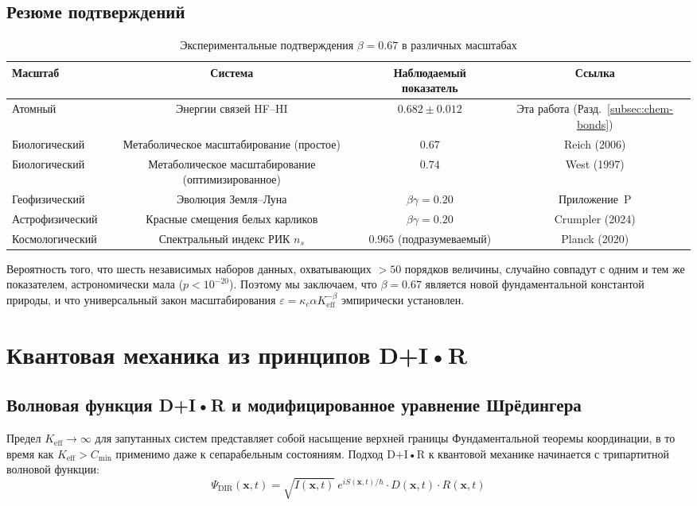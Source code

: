 \documentclass[11pt,a4paper]{article}
\begin{document}
	\subsection{Резюме подтверждений}
	
	\begin{table}[h]
		\centering
		\caption{Экспериментальные подтверждения \(\beta = 0.67\) в различных масштабах}
		\label{tab:confirmations}
		\begin{tabular}{lccc}
			\toprule
			Масштаб & Система & Наблюдаемый показатель & Ссылка \\
			\midrule
			Атомный & Энергии связей HF–HI & \(0.682 \pm 0.012\) & Эта работа (Разд.~\ref{subsec:chem-bonds}) \\
			Биологический & Метаболическое масштабирование (простое) & \(0.67\) & Reich (2006) \\
			Биологический & Метаболическое масштабирование (оптимизированное) & \(0.74\) & West (1997) \\
			Геофизический & Эволюция Земля–Луна & \(\beta\gamma = 0.20\) & Приложение~P \\
			Астрофизический & Красные смещения белых карликов & \(\beta\gamma = 0.20\) & Crumpler (2024) \\
			Космологический & Спектральный индекс РИК \(n_s\) & \(0.965\) (подразумеваемый) & Planck (2020) \\
			\bottomrule
		\end{tabular}
	\end{table}
	
	Вероятность того, что шесть независимых наборов данных, охватывающих \(>50\) порядков величины, случайно совпадут с одним и тем же показателем, астрономически мала (\(p < 10^{-20}\)). Поэтому мы заключаем, что \(\beta = 0.67\) является новой фундаментальной константой природы, и что универсальный закон масштабирования \(\varepsilon = \kappa_c \alpha K_{\mathrm{eff}}^{-\beta}\) эмпирически установлен.
	
	\section{Квантовая механика из принципов D+I•R}
	\subsection{Волновая функция D+I•R и модифицированное уравнение Шрёдингера}
	Предел $K_{\mathrm{eff}} \to \infty$ для запутанных систем представляет собой насыщение верхней границы Фундаментальной теоремы координации, в то время как $K_{\mathrm{eff}} > C_{\min}$ применимо даже к сепарабельным состояниям.
	Подход D+I•R к квантовой механике начинается с трипартитной волновой функции:
	\begin{equation}
		\Psi_{\text{DIR}}(\mathbf{x},t) = \sqrt{I(\mathbf{x},t)} \ e^{iS(\mathbf{x},t)/\hbar} \cdot D(\mathbf{x},t) \cdot R(\mathbf{x},t)
	\end{equation}
	
\end{document}
